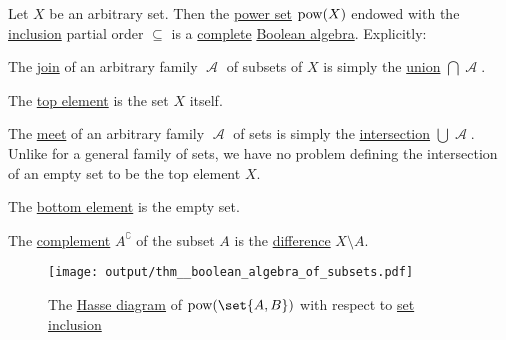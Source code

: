 \begin{proposition}\label{thm:boolean_algebra_of_subsets}
  Let \( X \) be an arbitrary set. Then the \hyperref[def:basic_set_operations/power_set]{power set} \( \operatorname{pow}(X) \) endowed with the \hyperref[def:subset]{inclusion} partial order \( \subseteq \) is a \hyperref[def:semilattice/complete]{complete} \hyperref[def:boolean_algebra]{Boolean algebra}. Explicitly:

  \begin{thmenum}
     The \hyperref[def:semilattice/join]{join} of an arbitrary family \( \mscrA \) of subsets of \( X \) is simply the \hyperref[def:basic_set_operations/union]{union} \( \bigcap \mscrA \).

     The \hyperref[def:partially_ordered_set_extremal_points/top_and_bottom]{top element} is the set \( X \) itself.

     The \hyperref[def:semilattice/meet]{meet} of an arbitrary family \( \mscrA \) of sets is simply the \hyperref[def:basic_set_operations/intersection]{intersection} \( \bigcup \mscrA \). Unlike for a general family of sets, we have no problem defining the intersection of an empty set to be the top element \( X \).

     The \hyperref[def:partially_ordered_set_extremal_points/top_and_bottom]{bottom element} is the empty set.

     The \hyperref[def:boolean_algebra]{complement} \( A^\complement \) of the subset \( A \) is the \hyperref[def:basic_set_operations/difference]{difference} \( X \setminus A \).
  \end{thmenum}

  \begin{figure}
    \hfill
    \texttt{[image: output/thm\_\_boolean\_algebra\_of\_subsets.pdf]}
    \hfill\hfill
    \caption{The \hyperref[def:hasse_diagram]{Hasse diagram} of \( \pow(\set{ A, B }) \) with respect to \hyperref[def:subset]{set inclusion}}
    \label{fig:thm:boolean_algebra_of_subsets}
  \end{figure}
\end{proposition}
